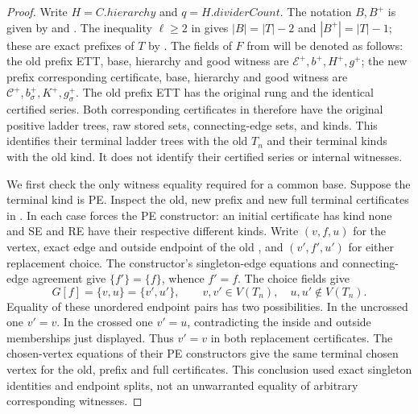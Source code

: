 \begin{proof}
Write $H=C.\mathit{hierarchy}$ and $q=H.\mathit{dividerCount}$.
The notation $B,B^+$ is given by  and
. The inequality $\ell\ge2$ in
 gives
$|B|=|T|-2$ and $|B^+|=|T|-1$; these are exact prefixes of $T$ by
. The fields of $F$ from
 will be denoted as follows: the old prefix
ETT, base, hierarchy and good witness are $\mathcal E^+,b^+,H^+,g^+$;
the new prefix corresponding certificate, base, hierarchy and good
witness are $\mathcal C^+,b^+_\sigma,K^+,g^+_\sigma$.
The old prefix ETT has the original rung and the identical certified
series. Both corresponding certificates in
 therefore have the original
positive ladder trees, raw stored sets, connecting-edge sets, and kinds.
This identifies their terminal ladder trees with the old $T_n$ and their
terminal kinds with the old kind. It does not identify their certified
series or internal witnesses.

We first check the only witness equality required for a common base.
Suppose the terminal kind is PE. Inspect the old, new prefix and new full
terminal certificates in . In each case
 forces the PE constructor: an initial
certificate has kind none and SE and RE have their respective different
kinds. Write $(v,f,u)$ for the vertex, exact edge and outside endpoint of
the old , and $(v',f',u')$ for either
replacement choice. The constructor's singleton-edge equations and
connecting-edge agreement give $\{f'\}=\{f\}$, whence $f'=f$.
The choice fields give
\[
 G[f]=\{v,u\}=\{v',u'\},\qquad
 v,v'\in V(T_n),\quad u,u'\notin V(T_n).
\]
Equality of these unordered endpoint pairs has two possibilities. In the
uncrossed one $v'=v$. In the crossed one $v'=u$, contradicting the inside
and outside memberships just displayed. Thus $v'=v$ in both replacement
certificates. The chosen-vertex equations of their PE constructors give
the same terminal chosen vertex for the old, prefix and full certificates.
This conclusion used exact singleton identities and endpoint splits, not
an unwarranted equality of arbitrary corresponding witnesses.


\end{proof}
